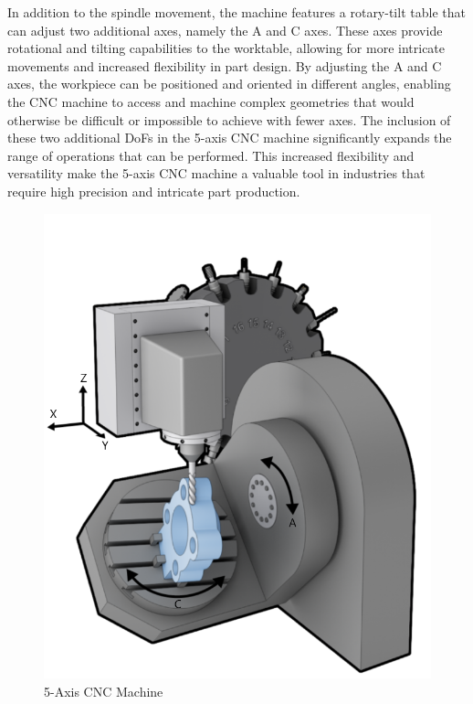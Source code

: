 In addition to the spindle movement, the machine features a rotary-tilt table that can adjust two additional axes, namely the A and C axes. These axes provide rotational and tilting capabilities to the worktable, allowing for more intricate movements and increased flexibility in part design. By adjusting the A and C axes, the workpiece can be positioned and oriented in different angles, enabling the \acrshort{CNC} machine to access and machine complex geometries that would otherwise be difficult or impossible to achieve with fewer axes. %
The inclusion of these two additional \acrshort{DoF}s in the 5-axis \acrshort{CNC} machine significantly expands the range of operations that can be performed. %
This increased flexibility and versatility make the 5-axis \acrshort{CNC} machine a valuable tool in industries that require high precision and intricate part production.

\begin{figure}[H]
	\centerline{\includegraphics[scale=.65]{figures/5ax.png}}
	\caption{5-Axis CNC Machine~\cite{5ax}}
	\label{5ax}
\end{figure}



